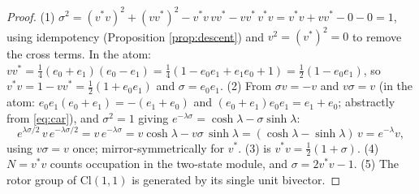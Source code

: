 \documentclass[11pt]{article}
\theoremstyle{definition}
\newcommand{\Cl}{\mathrm{Cl}}
\begin{document}
\begin{proof}
(1) $\sigma^2 = (v^*v)^2 + (vv^*)^2 - v^*v\,vv^* - vv^*\,v^*v = v^*v + vv^* - 0 - 0 = 1$, using idempotency (Proposition \ref{prop:descent}) and $v^2 = (v^*)^2 = 0$ to remove the cross terms. In the atom: $v v^* = \tfrac14(e_0 + e_1)(e_0 - e_1) = \tfrac14(1 - e_0e_1 + e_1e_0 + 1) = \tfrac12(1 - e_0e_1)$, so $v^*v = 1 - vv^* = \tfrac12(1 + e_0e_1)$ and $\sigma = e_0 e_1$. (2) From $\sigma v = -v$ and $v\sigma = v$ (in the atom: $e_0e_1(e_0 + e_1) = -(e_1 + e_0)$ and $(e_0+e_1)e_0e_1 = e_1 + e_0$; abstractly from \eqref{eq:car}), and $\sigma^2 = 1$ giving $e^{-\lambda\sigma} = \cosh\lambda - \sigma\sinh\lambda$:
\[
e^{\lambda\sigma/2}\,v\,e^{-\lambda\sigma/2} = v\,e^{-\lambda\sigma} = v\cosh\lambda - v\sigma\,\sinh\lambda = (\cosh\lambda - \sinh\lambda)\,v = e^{-\lambda}v ,
\]
using $v\sigma = v$ once; mirror-symmetrically for $v^*$. (3) is $v^*v = \tfrac12(1 + \sigma)$. (4) $N = v^*v$ counts occupation in the two-state module, and $\sigma = 2v^*v - 1$. (5) The rotor group of $\Cl(1,1)$ is generated by its single unit bivector.
\end{proof}
\end{document}
